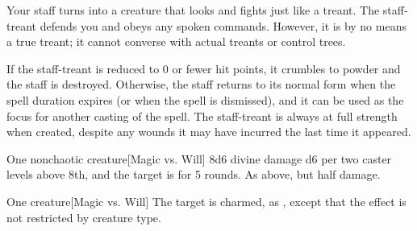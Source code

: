 \spelldur{\durmed \dismissable}
\spellline
\spelleffect Your staff turns into a creature that looks and fights just like a treant. The staff-treant defends you and obeys any spoken commands. However, it is by no means a true treant; it cannot converse with actual treants or control trees.

If the staff-treant is reduced to 0 or fewer hit points, it crumbles to powder and the staff is destroyed. Otherwise, the staff returns to its normal form when the spell duration expires (or when the spell is dismissed), and it can be used as the focus for another casting of the spell. The staff-treant is always at full strength when created, despite any wounds it may have incurred the last time it appeared.
\spellline
{}

\spellrng{\rngmed}
\begin{spelltarget}{One nonchaotic creature}[Magic vs. Will]
    \spellsuccess 8d6 divine damage \add d6 per two caster levels above 8th, and the target is \bewildered for 5 rounds.
    \spellfailure As above, but half damage.
\end{spelltarget}

\spellrng{\rngmed}
\spelldur{\durlong}
\begin{spelltarget}{One creature}[Magic vs. Will]
    \spellsuccess The target is charmed, as , except that the effect is not restricted by creature type.
\end{spelltarget}

